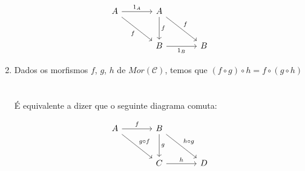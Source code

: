\begin{defi}[Categorias]
\begin{enumerate}
\[\begin{tikzcd}[sep=large]
	A & A \\
	& B & B
	\arrow["{1_A}", from=1-1, to=1-2]
	\arrow["f"', from=1-1, to=2-2]
	\arrow["f", from=1-2, to=2-2]
	\arrow["f", from=1-2, to=2-3]
	\arrow["{1_B}"', from=2-2, to=2-3]
\end{tikzcd}\]
\item Dados os morfismos $f$, $g$, $h$ de $Mor(\mathcal{C})$, temos que 
$(f \circ g) \circ h = f \circ (g \circ h)$
\\
\\
\\
É equivalente a dizer que o seguinte diagrama comuta:

\[\begin{tikzcd}[sep=large]
	A & B \\
	& C & D
	\arrow["f", from=1-1, to=1-2]
	\arrow["{g \circ f}", from=1-1, to=2-2]
	\arrow["g", from=1-2, to=2-2]
	\arrow["{h \circ g}", from=1-2, to=2-3]
	\arrow["h", from=2-2, to=2-3]
\end{tikzcd}\]
\end{enumerate}
\end{defi}



